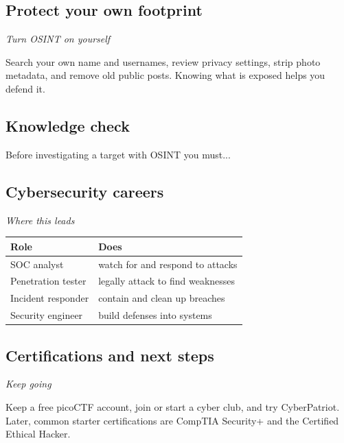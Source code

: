\documentclass[12pt,openany]{book}
\begin{document}
\medskip

\subsection*{Protect your own footprint}
{\small\itshape\color{gray}Turn OSINT on yourself}


Search your own name and usernames, review privacy settings, strip photo metadata, and remove old public posts. Knowing what is exposed helps you defend it.

\medskip

\subsection*{Knowledge check}

Before investigating a target with OSINT you must...

\medskip

\subsection*{Cybersecurity careers}
{\small\itshape\color{gray}Where this leads}


\begin{center}\small\begin{tabular}{p{6.5cm}p{6.5cm}}\toprule
\textbf{Role} & \textbf{Does} \\ \midrule
SOC analyst & watch for and respond to attacks \\
Penetration tester & legally attack to find weaknesses \\
Incident responder & contain and clean up breaches \\
Security engineer & build defenses into systems \\
\bottomrule\end{tabular}\end{center}

\medskip

\subsection*{Certifications and next steps}
{\small\itshape\color{gray}Keep going}


Keep a free picoCTF account, join or start a cyber club, and try CyberPatriot. Later, common starter certifications are CompTIA Security+ and the Certified Ethical Hacker.

\medskip
\end{document}
